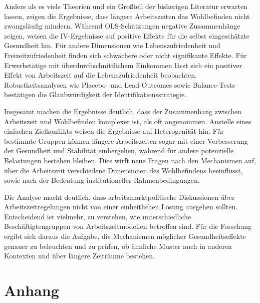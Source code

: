 \documentclass[12pt,a4paper]{article}
\begin{document}
Anders als es viele Theorien und ein Großteil der bisherigen Literatur erwarten lassen, zeigen die Ergebnisse, dass längere Arbeitszeiten das Wohlbefinden nicht zwangsläufig mindern. Während OLS-Schätzungen negative Zusammenhänge zeigen, weisen die IV-Ergebnisse auf positive Effekte für die selbst eingeschätzte Gesundheit hin. Für andere Dimensionen wie Lebenszufriedenheit und Freizeitzufriedenheit finden sich schwächere oder nicht signifikante Effekte. Für Erwerbstätige mit überdurchschnittlichem Einkommen lässt sich ein positiver Effekt von Arbeitszeit auf die Lebenszufriedenheit beobachten. Robustheitsanalysen wie Placebo- und Lead-Outcomes sowie Balance-Tests bestätigen die Glaubwürdigkeit der Identifikationsstrategie.  

Insgesamt machen die Ergebnisse deutlich, dass der Zusammenhang zwischen Arbeitszeit und Wohlbefinden komplexer ist, als oft angenommen. Anstelle eines einfachen Zielkonflikts weisen die Ergebnisse auf Heterogenität hin. Für bestimmte Gruppen können längere Arbeitszeiten sogar mit einer Verbesserung der Gesundheit und Stabilität einhergehen, während für andere potenzielle Belastungen bestehen bleiben. Dies wirft neue Fragen nach den Mechanismen auf, über die Arbeitszeit verschiedene Dimensionen des Wohlbefindens beeinflusst, sowie nach der Bedeutung institutioneller Rahmenbedingungen.

Die Analyse macht deutlich, dass arbeitsmarktpolitische Diskussionen über Arbeitszeitregelungen nicht von einer einheitlichen Lösung ausgehen sollten. Entscheidend ist vielmehr, zu verstehen, wie unterschiedliche Beschäftigtengruppen von Arbeitszeitmodellen betroffen sind. Für die Forschung ergibt sich daraus die Aufgabe, die Mechanismen möglicher Gesundheitseffekte genauer zu beleuchten und zu prüfen, ob ähnliche Muster auch in anderen Kontexten und über längere Zeiträume bestehen.



\newpage
\printbibliography



\clearpage
\section*{Anhang}
\appendix
\renewcommand{\thefigure}{A\arabic{figure}}
\renewcommand{\thetable}{A\arabic{table}}
\setcounter{figure}{0}
\setcounter{table}{0}

\end{document}
